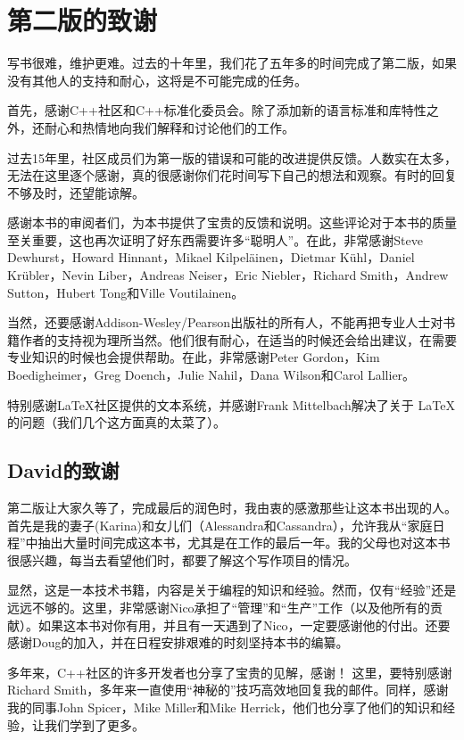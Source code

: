 \chapter{第二版的致谢}

写书很难，维护更难。过去的十年里，我们花了五年多的时间完成了第二版，如果没有其他人的支持和耐心，这将是不可能完成的任务。

首先，感谢C++社区和C++标准化委员会。除了添加新的语言标准和库特性之外，还耐心和热情地向我们解释和讨论他们的工作。

过去15年里，社区成员们为第一版的错误和可能的改进提供反馈。人数实在太多，无法在这里逐个感谢，真的很感谢你们花时间写下自己的想法和观察。有时的回复不够及时，还望能谅解。

感谢本书的审阅者们，为本书提供了宝贵的反馈和说明。这些评论对于本书的质量至关重要，这也再次证明了好东西需要许多“聪明人”。在此，非常感谢Steve Dewhurst，Howard Hinnant，Mikael Kilpel{\"a}inen，Dietmar K{\"u}hl，Daniel Kr{\"u}bler，Nevin Liber，Andreas Neiser，Eric Niebler，Richard Smith，Andrew Sutton，Hubert Tong和Ville Voutilainen。

当然，还要感谢Addison-Wesley/Pearson出版社的所有人，不能再把专业人士对书籍作者的支持视为理所当然。他们很有耐心，在适当的时候还会给出建议，在需要专业知识的时候也会提供帮助。在此，非常感谢Peter Gordon，Kim Boedigheimer，Greg Doench，Julie Nahil，Dana
Wilson和Carol Lallier。

特别感谢LaTeX社区提供的文本系统，并感谢Frank Mittelbach解决了关于 \LaTeX 的问题（我们几个这方面真的太菜了）。

\section*{David的致谢}

第二版让大家久等了，完成最后的润色时，我由衷的感激那些让这本书出现的人。首先是我的妻子(Karina)和女儿们（Alessandra和Cassandra），允许我从“家庭日程”中抽出大量时间完成这本书，尤其是在工作的最后一年。我的父母也对这本书很感兴趣，每当去看望他们时，都要了解这个写作项目的情况。

显然，这是一本技术书籍，内容是关于编程的知识和经验。然而，仅有“经验”还是远远不够的。这里，非常感谢Nico承担了“管理”和“生产”工作（以及他所有的贡献）。如果这本书对你有用，并且有一天遇到了Nico，一定要感谢他的付出。还要感谢Doug的加入，并在日程安排艰难的时刻坚持本书的编纂。

多年来，C++社区的许多开发者也分享了宝贵的见解，感谢！ 这里，要特别感谢Richard Smith，多年来一直使用“神秘的”技巧高效地回复我的邮件。同样，感谢我的同事John Spicer，Mike Miller和Mike Herrick，他们也分享了他们的知识和经验，让我们学到了更多。

